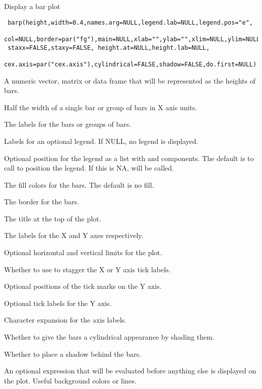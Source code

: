 \begin{Description}\relax
Display a bar plot
\end{Description}
\begin{Usage}
\begin{verbatim}
 barp(height,width=0.4,names.arg=NULL,legend.lab=NULL,legend.pos="e",
 col=NULL,border=par("fg"),main=NULL,xlab="",ylab="",xlim=NULL,ylim=NULL,
 staxx=FALSE,staxy=FALSE, height.at=NULL,height.lab=NULL,
 cex.axis=par("cex.axis"),cylindrical=FALSE,shadow=FALSE,do.first=NULL)
\end{verbatim}
\end{Usage}
\begin{Arguments}
\begin{ldescription}
\item[\code{height}] A numeric vector, matrix or data frame that will be represented
as the heights of bars.
\item[\code{width}] Half the width of a single bar or group of bars in X axis units.
\item[\code{names.arg}] The labels for the bars or groups of bars.
\item[\code{legend.lab}] Labels for an optional legend. If NULL, no legend is
displayed.
\item[\code{legend.pos}] Optional position for the legend as a list with 
and  components. The default is to call 
to position the legend. If this is NA,  will be called.
\item[\code{col}] The fill colors for the bars. The default is no fill.
\item[\code{border}] The border for the bars.
\item[\code{main}] The title at the top of the plot.
\item[\code{xlab,ylab}] The labels for the X and Y axes respectively.
\item[\code{xlim,ylim}] Optional horizontal and vertical limits for the plot.
\item[\code{staxx,staxy}] Whether to use  to stagger the 
X or Y axis tick labels.
\item[\code{height.at}] Optional positions of the tick marks on the Y axis.
\item[\code{height.lab}] Optional tick labels for the Y axis.
\item[\code{cex.axis}] Character expansion for the axis labels.
\item[\code{cylindrical}] Whether to give the bars a cylindrical appearance
by shading them.
\item[\code{shadow}] Whether to place a shadow behind the bars.
\item[\code{do.first}] An optional expression that will be evaluated before anything
else is displayed on the plot. Useful background colors or lines.
\end{ldescription}
\end{Arguments}
